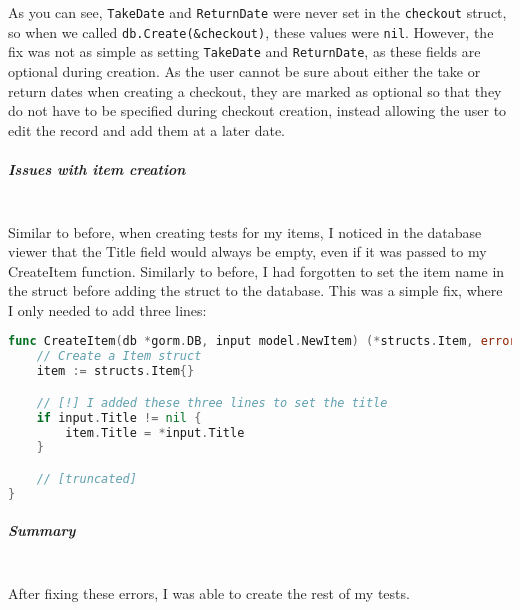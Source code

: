 \documentclass[../../main.tex]{subfiles}
\begin{document}
\noindent As you can see, \lstinline{TakeDate} and \lstinline{ReturnDate} were never set in the \lstinline{checkout} struct, so when we called \lstinline{db.Create(&checkout)}, these values were \lstinline{nil}.
However, the fix was not as simple as setting \lstinline{TakeDate} and \lstinline{ReturnDate}, as these fields are optional during creation. As the user cannot be sure about either the take or return dates when creating a checkout, they are marked as optional so that they do not have to be specified during checkout creation, instead allowing the user to edit the record and add them at a later date.

\subparagraph{Issues with item creation}

\noindent \\ Similar to before, when creating tests for my items, I noticed in the database viewer that the Title field would always be empty, even if it was passed to my CreateItem function.
Similarly to before, I had forgotten to set the item name in the struct before adding the struct to the database.
This was a simple fix, where I only needed to add three lines:

\begin{lstlisting}[language=Go]
func CreateItem(db *gorm.DB, input model.NewItem) (*structs.Item, error) {
	// Create a Item struct
	item := structs.Item{}

    // [!] I added these three lines to set the title
    if input.Title != nil {
		item.Title = *input.Title
	}

    // [truncated]
}
\end{lstlisting}

\begin{comment}
\noindent \\ commits:
\begin{outline}
    \1 User/create: email validation was broken, 72 char limit for passwords
    \2 https://github.com/jcxldn/fosscat/commit/605df88838143f717779ba289b58d567b5929a5a
    \1 Checkout/create: take and return dates not being stored in database
    \2 https://github.com/jcxldn/fosscat/commit/64d53884117ffc035b523457f9ee87433868e65c
    \1 Item/create: title not stored in DB
    \2 https://github.com/jcxldn/fosscat/commit/73aa435cc089d95f25d88ebdff6b77fc95cd3543
\end{outline}
\end{comment}

\subparagraph{Summary}

\noindent \\ After fixing these errors, I was able to create the rest of my tests.
\end{document}
